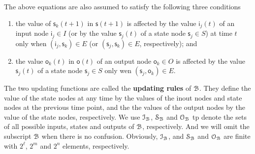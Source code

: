 \begin{definition}
\begin{itemize}
\begin{equation}
\label{equ:1}
\end{equation}
The above equations are also assumed to satisfy the following three conditions
\begin{enumerate}
\item the value of $\mathsf{s}_k(t+1)$ in $\mathsf{s}(t+1)$ is affected by the value  $\mathsf{i}_j(t)$ of an input node $\mathsf{i}_j \in I$ (or by the value $\mathsf{s}_j(t)$ of a state node $\mathsf{s}_j\in S$) at time $t$ only when $(\mathsf{i}_j, \mathsf{s}_k)\in E$ (or $(\mathsf{s}_j, \mathsf{s}_k)\in E$, respectively); and
\item the value $\mathsf{o}_k(t)$ in $\mathsf{o}(t)$ of an output node $\mathsf{o}_k\in O$ is affected by the value $\mathsf{s}_j(t)$ of a state node $\mathsf{s}_j\in S$ only wen $(\mathsf{s}_j,\mathsf{o}_k)\in E$.
\end{enumerate}
\end{itemize}

\end{definition}
 The two updating functions are called the  {\bf updating rules}  of ${\mathcal{B}}$. They define the value of the state nodes at any time by the values of the inout nodes and state nodes at the previous time point, and the the values of the output nodes by the value of the state nodes, respectively. We use $\mathcal{I}_{\mathcal{B}}$, $\mathcal{S}_{\mathcal{B}}$ and $\mathcal{O}_{\mathcal{B}}$ tp denote  the sets of all possible inputs, states and outputs of ${\mathcal{B}}$, respectively. And we will omit the subscript ${\mathcal{B}}$ when there is no confusion. Obviously, $\mathcal{I}_{\mathcal{B}}$, and $\mathcal{S}_{\mathcal{B}}$ and $\mathcal{O}_{\mathcal{B}}$ are finite with $2^\ell$, $2^m$ and $2^n$ elements, respectively. 


